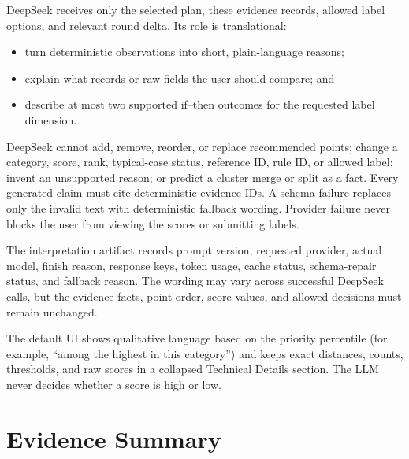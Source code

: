 \documentclass[11pt]{article}
\begin{document}
DeepSeek receives only the selected plan, these evidence records, allowed label
options, and relevant round delta. Its role is translational:
\begin{itemize}[leftmargin=*]
    \item turn deterministic observations into short, plain-language reasons;
    \item explain what records or raw fields the user should compare; and
    \item describe at most two supported if--then outcomes for the requested
    label dimension.
\end{itemize}

DeepSeek cannot add, remove, reorder, or replace recommended points; change a
category, score, rank, typical-case status, reference ID, rule ID, or allowed
label; invent an unsupported reason; or predict a cluster merge or split as a
fact. Every generated claim must cite deterministic evidence IDs. A schema
failure replaces only the invalid text with deterministic fallback wording.
Provider failure never blocks the user from viewing the scores or submitting
labels.

The interpretation artifact records prompt version, requested provider, actual
model, finish reason, response keys, token usage, cache status, schema-repair
status, and fallback reason. The wording may vary across successful DeepSeek
calls, but the evidence facts, point order, score values, and allowed decisions
must remain unchanged.

The default UI shows qualitative language based on the priority percentile
(for example, ``among the highest in this category'') and keeps exact distances,
counts, thresholds, and raw scores in a collapsed Technical Details section.
The LLM never decides whether a score is high or low.

\section{Evidence Summary}
\end{document}
